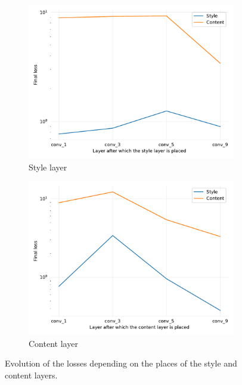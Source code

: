 \documentclass[twocolumn,superscriptaddress,aps,floatfix, nofootinbib]{revtex4-1}
\begin{document}
    \begin{figure}[ht]
        \centering
        \begin{subfigure}[b]{0.22\textwidth}
            \centering
            \includegraphics[width=\textwidth]{resources/png/layers/style_losses.pdf}
            \caption{Style layer}
            \label{fig:loss.layers.style}
        \end{subfigure}
        \hfill
        \begin{subfigure}[b]{0.22\textwidth}
            \centering
            \includegraphics[width=\textwidth]{resources/png/layers/content_losses.pdf}
            \caption{Content layer}
            \label{fig:loss.layers.content}
        \end{subfigure}
        \caption{Evolution of the losses depending on the places of the style and content layers.}
        \label{fig:loss.layers}
    \end{figure}
    
\end{document}
